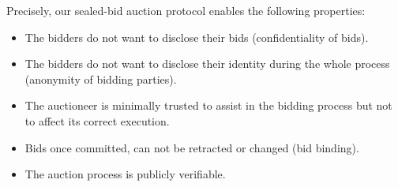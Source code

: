 
Precisely, our sealed-bid auction protocol enables the following properties:
\begin{itemize}
\item The bidders do not want to disclose their bids (confidentiality
  of bids).
\item The bidders do not want to disclose their identity during the
  whole process (anonymity of bidding parties).
\item The auctioneer is minimally trusted to assist in the bidding
  process but not to affect its correct execution.
\item Bids once committed, can not be retracted or changed (bid
  binding).
\item The auction process is publicly verifiable.
\end{itemize}


